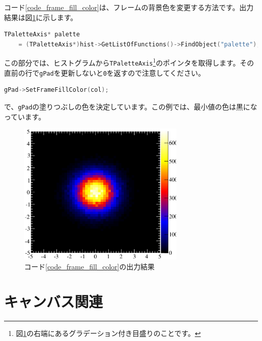 \begin{NoFloat}

\end{NoFloat}

コード\ref{code_frame_fill_color}は、フレームの背景色を変更する方法です。出力結果は図\ref{fig_frame_fill_color_eps}に示します。

\begin{lstlisting}[language=C++]
  TPaletteAxis* palette 
    = (TPaletteAxis*)hist->GetListOfFunctions()->FindObject("palette"); 
\end{lstlisting}
この部分では、ヒストグラムから\texttt{TPaletteAxis}\footnote{図\ref{fig_frame_fill_color_eps}の右端にあるグラデーション付き目盛りのことです。}のポインタを取得します。その直前の行で\texttt{gPad}を更新しないと\texttt{0}を返すので注意してください。
\begin{lstlisting}[language=C++]
  gPad->SetFrameFillColor(col); 
\end{lstlisting}
で、\texttt{gPad}の塗りつぶしの色を決定しています。この例では、最小値の色は黒になっています。

\begin{figure}
  \begin{center}
    \includegraphics[width=8cm,clip]{fig/frame_fill_color.eps}
    \caption{コード\ref{code_frame_fill_color}の出力結果}
    \label{fig_frame_fill_color_eps}
  \end{center}
\end{figure}


\section{キャンバス関連}

